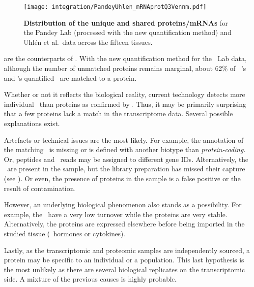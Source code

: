 \begin{figure}[!ht]
    \texttt{[image: integration/PandeyUhlen\_mRNAprotQ3Vennm.pdf]}\centering
    \vspace{-4mm}
    \caption[Distribution of the unique and shared proteins/mRNAs for the
    Pandey Lab (processed with the new quantification method) and Uhlén et al.\ data
    across the fifteen tissues.
    ]{\label{fig:PU_vennQ3}\textbf{Distribution of the
    unique and shared proteins/mRNAs} for
    the Pandey Lab (processed with the new quantification method)
    and Uhlén et al.\ data across the fifteen tissues.}
\end{figure}

 are
the counterparts of .
With the new quantification method for the \pandey\ Lab data,
although the number of unmatched proteins remains marginal,
about 62\% of \uhlen\ \etal{}'s and \gtex{}'s quantified \mRNAs\
are matched to a protein.


Whether or not it reflects the biological reality,
current technology detects more individual \mRNAs\ than proteins
as confirmed by \Cref{fig:UniqExprPC1,fig:distribProtUniq3D}.
Thus, it may be primarily surprising that
a few proteins lack a match in the transcriptome data.
Several possible explanations exist.

Artefacts or technical issues are the most likely.
For example, the annotation of the matching \RNA\ is missing
or is defined with another biotype than \emph{protein-coding}.
Or, peptides and \mRNA\ reads may be assigned to different gene IDs.
Alternatively, the \mRNAs\ are present in the sample,
but the library preparation has missed their capture
(see ).
Or even, the presence of proteins in the sample is a false positive
or the result of contamination.

However, an underlying biological phenomenon also stands as a possibility.
For example, the \mRNAs\ have a very low turnover while the proteins are very stable.
Alternatively, the proteins are expressed elsewhere before being imported in the studied tissue
(\eg\ hormones or cytokines).

Lastly, as the transcriptomic and proteomic samples are independently sourced,
a protein may be specific to an individual or a population.
This last hypothesis is the most unlikely
as there are several biological replicates on the transcriptomic side.
A mixture of the previous causes is highly probable.

